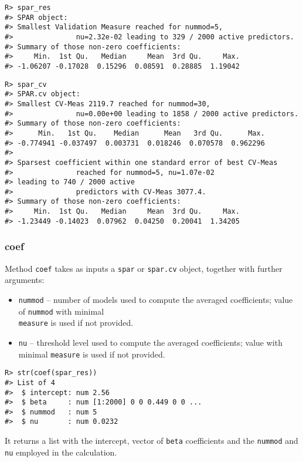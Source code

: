 \documentclass[
  article]{jss}
\begin{document}
\begin{verbatim}
R> spar_res
#> SPAR object:
#> Smallest Validation Measure reached for nummod=5,
#>               nu=2.32e-02 leading to 329 / 2000 active predictors.
#> Summary of those non-zero coefficients:
#>     Min.  1st Qu.   Median     Mean  3rd Qu.     Max. 
#> -1.06207 -0.17028  0.15296  0.08591  0.28885  1.19042
\end{verbatim}

\begin{verbatim}
R> spar_cv
#> SPAR.cv object:
#> Smallest CV-Meas 2119.7 reached for nummod=30,
#>               nu=0.00e+00 leading to 1858 / 2000 active predictors.
#> Summary of those non-zero coefficients:
#>      Min.   1st Qu.    Median      Mean   3rd Qu.      Max. 
#> -0.774941 -0.037497  0.003731  0.018246  0.070578  0.962296 
#> 
#> Sparsest coefficient within one standard error of best CV-Meas
#>               reached for nummod=5, nu=1.07e-02 
#> leading to 740 / 2000 active
#>               predictors with CV-Meas 3077.4.
#> Summary of those non-zero coefficients:
#>     Min.  1st Qu.   Median     Mean  3rd Qu.     Max. 
#> -1.23449 -0.14023  0.07962  0.04250  0.20041  1.34205
\end{verbatim}

\subsubsection{coef}\label{coef}

Method \texttt{coef} takes as inputs a \texttt{spar} or \texttt{spar.cv}
object, together with further arguments:

\begin{itemize}
\item
  \texttt{nummod} -- number of models used to compute the averaged
  coefficients; value of \texttt{nummod} with minimal\\
  \texttt{measure} is used if not provided.
\item
  \texttt{nu} -- threshold level used to compute the averaged
  coefficients; value with minimal \texttt{measure} is used if not
  provided.
\end{itemize}

\begin{verbatim}
R> str(coef(spar_res))
#> List of 4
#>  $ intercept: num 2.56
#>  $ beta     : num [1:2000] 0 0 0.449 0 0 ...
#>  $ nummod   : num 5
#>  $ nu       : num 0.0232
\end{verbatim}

It returns a list with the intercept, vector of \texttt{beta}
coefficients and the \texttt{nummod} and \texttt{nu} employed in the
calculation.
\end{document}
